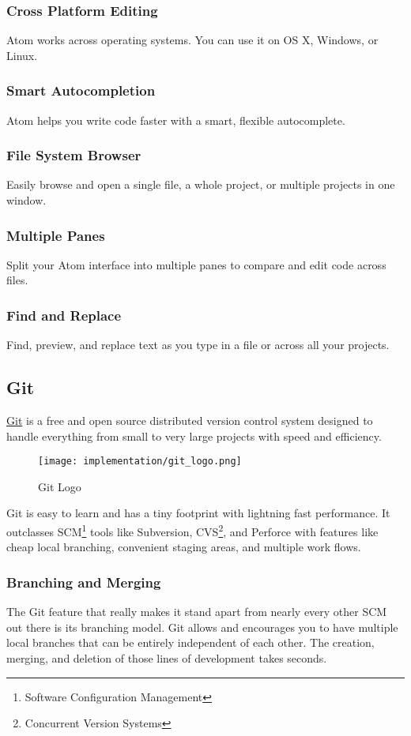 	\subsubsection{Cross Platform Editing}
		Atom works across operating systems. You can use it on OS X, Windows, or Linux.
	\subsubsection{Smart Autocompletion}
		Atom helps you write code faster with a smart, flexible autocomplete.
	\subsubsection{File System Browser}
		Easily browse and open a single file, a whole project, or multiple projects in one window.
	\subsubsection{Multiple Panes}
		Split your Atom interface into multiple panes to compare and edit code across files.
	\subsubsection{Find and Replace}
		Find, preview, and replace text as you type in a file or across all your projects.
		
\subsection{Git}
	\href{https://git-scm.com/}{Git} is a free and open source distributed version control system designed to handle everything from small to very large projects with speed and efficiency.
		\begin{wrapfigure}{r}{0.25\textwidth}
			\texttt{[image: implementation/git\_logo.png]}
			\caption{Git Logo}
		\end{wrapfigure}
	Git is easy to learn and has a tiny footprint with lightning fast performance. It outclasses SCM\footnote{Software Configuration Management} tools like Subversion, CVS\footnote{Concurrent Version Systems}, and Perforce with features like cheap local branching, convenient staging areas, and multiple work flows.\cite{git}
	\subsubsection{Branching and Merging}
		The Git feature that really makes it stand apart from nearly every other SCM out there is its branching model. Git allows and encourages you to have multiple local branches that can be entirely independent of each other. The creation, merging, and deletion of those lines of development takes seconds.
